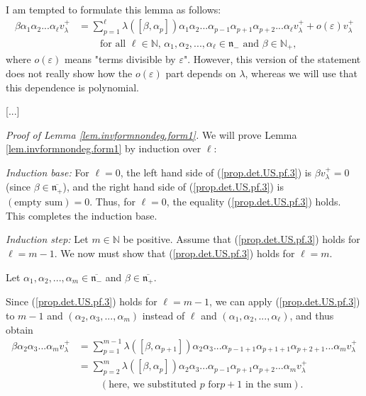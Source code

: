 \documentclass
[numbers=enddot,12pt,final,onecolumn,german,notitlepage]{scrartcl}%
\theoremstyle{definition}
\begin{document}
I am tempted to formulate this lemma as follows:%
\begin{align*}
\beta\alpha_{1}\alpha_{2}...\alpha_{\ell}v_{\lambda}^{+}  &  =\sum
\limits_{p=1}^{\ell}\lambda\left(  \left[  \beta,\alpha_{p}\right]  \right)
\alpha_{1}\alpha_{2}...\alpha_{p-1}\alpha_{p+1}\alpha_{p+2}...\alpha_{\ell
}v_{\lambda}^{+}+o\left(  \varepsilon\right)  v_{\lambda}^{+}\\
&  \ \ \ \ \ \ \ \ \ \ \text{for all }\ell\in\mathbb{N}\text{, }\alpha
_{1},\alpha_{2},...,\alpha_{\ell}\in\mathfrak{n}_{-}\text{ and }\beta
\in\mathbb{N}_{+},
\end{align*}
where $o\left(  \varepsilon\right)  $ means "terms divisible by $\varepsilon
$". However, this version of the statement does not really show how the
$o\left(  \varepsilon\right)  $ part depends on $\lambda$, whereas we will use
that this dependence is polynomial.

[...]

\textit{Proof of Lemma \ref{lem.invformnondeg.form1}.} We will prove Lemma
\ref{lem.invformnondeg.form1} by induction over $\ell$:

\textit{Induction base:} For $\ell=0$, the left hand side of
(\ref{prop.det.US.pf.3}) is $\beta v_{\lambda}^{+}=0$ (since $\beta
\in\overline{\mathfrak{n}_{+}}$), and the right hand side of
(\ref{prop.det.US.pf.3}) is $\left(  \text{empty sum}\right)  =0$. Thus, for
$\ell=0$, the equality (\ref{prop.det.US.pf.3}) holds. This completes the
induction base.

\textit{Induction step:} Let $m\in\mathbb{N}$ be positive. Assume that
(\ref{prop.det.US.pf.3}) holds for $\ell=m-1$. We now must show that
(\ref{prop.det.US.pf.3}) holds for $\ell=m$.

Let $\alpha_{1},\alpha_{2},...,\alpha_{m}\in\overline{\mathfrak{n}_{-}}$ and
$\beta\in\overline{\mathfrak{n}_{+}}$.

Since (\ref{prop.det.US.pf.3}) holds for $\ell=m-1$, we can apply
(\ref{prop.det.US.pf.3}) to $m-1$ and $\left(  \alpha_{2},\alpha
_{3},...,\alpha_{m}\right)  $ instead of $\ell$ and $\left(  \alpha_{1}%
,\alpha_{2},...,\alpha_{\ell}\right)  $, and thus obtain%
\begin{align*}
\beta\alpha_{2}\alpha_{3}...\alpha_{m}v_{\lambda}^{+}  &  =\sum\limits_{p=1}%
^{m-1}\lambda\left(  \left[  \beta,\alpha_{p+1}\right]  \right)  \alpha
_{2}\alpha_{3}...\alpha_{p-1+1}\alpha_{p+1+1}\alpha_{p+2+1}...\alpha
_{m}v_{\lambda}^{+}\\
&  =\sum\limits_{p=2}^{m}\lambda\left(  \left[  \beta,\alpha_{p}\right]
\right)  \alpha_{2}\alpha_{3}...\alpha_{p-1}\alpha_{p+1}\alpha_{p+2}%
...\alpha_{m}v_{\lambda}^{+}\\
&  \ \ \ \ \ \ \ \ \ \ \left(  \text{here, we substituted }p\text{ for
}p+1\text{ in the sum}\right)  .
\end{align*}
\end{document}
